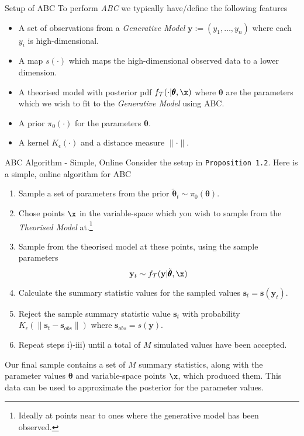 \documentclass[11pt,a4paper]{article}
\begin{document}
  \begin{proposition}{Setup of ABC}
    To perform \textit{ABC} we typically have/define the following features
    \begin{itemize}
      \item A set of observations from a \textit{Generative Model} $\mathbf{y}:=(y_1,\dots,y_n)$ where each $y_i$ is high-dimensional.
      \item A map $s(\cdot)$ which maps the high-dimensional observed data to a lower dimension.
      \item A theorised model with posterior pdf $f_\mathcal{T}(\cdot|\pmb\theta,\x)$ where $\pmb\theta$ are the parameters which we wish to fit to the \textit{Generative Model} using ABC.
      \item A prior $\pi_0(\cdot)$ for the parameters $\pmb\theta$.
      \item A kernel $K_\epsilon(\cdot)$ and a distance measure $\|\cdot\|$.
    \end{itemize}
  \end{proposition}

  \begin{proposition}{ABC Algorithm - Simple, Online}
    Consider the setup in \texttt{Proposition 1.2}. Here is a simple, online algorithm for ABC
    \begin{enumerate}
      \item Sample a set of parameters from the prior $\tilde{\pmb\theta}_t\sim\pi_0(\pmb\theta)$.
      \item Chose points $\x$ in the variable-space which you wish to sample from the \textit{Theorised Model} at.\footnote{Ideally at points near to ones where the generative model has been observed.}
      \item Sample from the theorised model at these points, using the sample parameters
      \[ \mathbf{y}_t\sim f_\mathcal{T}(\mathbf{y}|\tilde{\pmb\theta},\x) \]
      \item Calculate the summary statistic values for the sampled values $\mathbf{s}_t=\mathbf{s}(\mathbf{y}_t)$.
      \item Reject the sample summary statistic value $\mathbf{s}_t$ with probability $K_\epsilon(\|\mathbf{s}_t-\mathbf{s}_{obs}\|)$ where ${\mathbf{s}_{obs}=s(\mathbf{y})}$.
      \item Repeat steps i)-iii) until a total of $M$ simulated values have been accepted.
    \end{enumerate}
    Our final sample contains a set of $M$ summary statistics, along with the parameter values $\pmb\theta$ and variable-space points $\x$, which produced them. This data can be used to approximate the posterior for the parameter values.
  \end{proposition}
\end{document}
